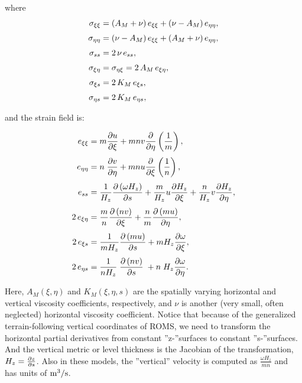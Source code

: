 where
\begin{align}
      {\sigma}_{\xi\xi}   &= \left( A_{M} + \nu \right) e_{\xi\xi} +
\left( \nu - A_{M}\right) e_{\eta\eta}, \\
   \noalign{\smallskip}
      {\sigma}_{\eta\eta} &= \left( \nu - A_{M} \right) e_{\xi\xi} +
\left( A_{M} + \nu\right) e_{\eta\eta}, \\
   \noalign{\smallskip}
      {\sigma}_{ss} &= 2\,\nu\,e_{ss}, \\
   \noalign{\smallskip}
      {\sigma}_{\xi\eta} &= {\sigma}_{\eta\xi} =
2\,A_{M}\,e_{\xi\eta}, \\
   \noalign{\smallskip}
      {\sigma}_{\xi s}   &=  2\,K_{M}\,e_{\xi s}, \\
   \noalign{\smallskip}
      {\sigma}_{\eta s}  &=  2\,K_{M}\,e_{\eta s},
\end{align}

and the strain field is:

\begin{align}
      e_{\xi\xi}   &= m  {\pder{u}{\xi}}  + mnv {\pder{}{\eta}}
\left( \frac{1}{m} \right), \\
   \noalign{\smallskip}
      e_{\eta\eta} &= n\;{\pder{v}{\eta}} + mnu {\pder{}{\xi}}
\left( \frac{1}{n} \right), \\
   \noalign{\smallskip}
      e_{ss} &= \frac{1}{H_{z}}   {\pder{\left( \omega H_{z} \right)
}{s}} + 
                \frac{m}{H_{z}} u {\pder{H_{z}}{\xi}} +
                \frac{n}{H_{z}} v {\pder{H_{z}}{\eta}}, \\
   \noalign{\smallskip}
      2\,e_{\xi\eta} &= \frac{m}{n} {\pder{\left( nv \right) }{\xi}}
+
                        \frac{n}{m} {\pder{\left( mu \right)
}{\eta}}, \\
   \noalign{\smallskip}
      2\,e_{\xi s} &= \frac{1}{mH_{z}}  {\pder{\left( mu \right)
}{s}} +
                 m H_{z} {\pder{\omega}{\xi}}, \\
   \noalign{\smallskip}
      2\,e_{\eta s} &= \frac{1}{nH_{z}} \;
{\pder{\left(nv\right)}{s}} \;+
                 n\;H_{z} {\pder{\omega}{\eta}}.
\end{align}

Here, $A_{M}(\xi,\eta)$ and $K_{M}(\xi,\eta,s)$ are the spatially
varying horizontal and vertical viscosity coefficients,
respectively, and $\nu$ is another (very small, often neglected)
horizontal viscosity coefficient. Notice that because of the
generalized terrain-following vertical coordinates of ROMS, we need
to transform the horizontal partial derivatives from constant
''z-''surfaces to constant ''s-''surfaces.  And the vertical metric
or level thickness is the Jacobian of the transformation,
$H_{z}={\frac{\partial z}{\partial s}}$. Also in these models, the ''vertical''
velocity is computed as $\frac{\omega H_{z}}{mn}$ and has units of
$\hbox{m}^3/\hbox{s}$.

